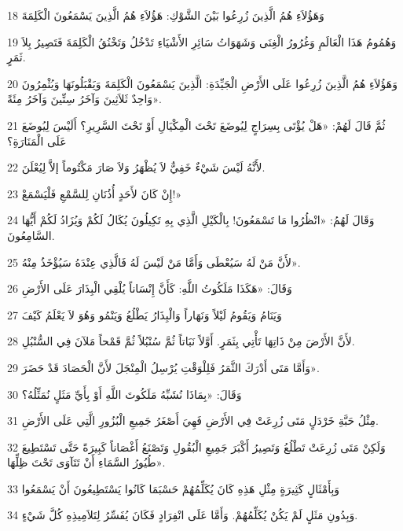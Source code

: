\par 18 وَهَؤُلاَءِ هُمُ الَّذِينَ زُرِعُوا بَيْنَ الشَّوْكِ: هَؤُلاَءِ هُمُ الَّذِينَ يَسْمَعُونَ الْكَلِمَةَ
\par 19 وَهُمُومُ هَذَا الْعَالَمِ وَغُرُورُ الْغِنَى وَشَهَوَاتُ سَائِرِ الأَشْيَاءِ تَدْخُلُ وَتَخْنُقُ الْكَلِمَةَ فَتَصِيرُ بِلاَ ثَمَرٍ.
\par 20 وَهَؤُلاَءِ هُمُ الَّذِينَ زُرِعُوا عَلَى الأَرْضِ الْجَيِّدَةِ: الَّذِينَ يَسْمَعُونَ الْكَلِمَةَ وَيَقْبَلُونَهَا وَيُثْمِرُونَ وَاحِدٌ ثَلاَثِينَ وَآخَرُ سِتِّينَ وَآخَرُ مِئَةً».
\par 21 ثُمَّ قَالَ لَهُمْ: «هَلْ يُؤْتَى بِسِرَاجٍ لِيُوضَعَ تَحْتَ الْمِكْيَالِ أَوْ تَحْتَ السَّرِيرِ؟ أَلَيْسَ لِيُوضَعَ عَلَى الْمَنَارَةِ؟
\par 22 لأَنَّهُ لَيْسَ شَيْءٌ خَفِيٌّ لاَ يُظْهَرُ وَلاَ صَارَ مَكْتُوماً إلاَّ لِيُعْلَنَ.
\par 23 إِنْ كَانَ لأَحَدٍ أُذُنَانِ لِلسَّمْعِ فَلْيَسْمَعْ!»
\par 24 وَقَالَ لَهُمُ: «انْظُرُوا مَا تَسْمَعُونَ! بِالْكَيْلِ الَّذِي بِهِ تَكِيلُونَ يُكَالُ لَكُمْ وَيُزَادُ لَكُمْ أَيُّهَا السَّامِعُونَ.
\par 25 لأَنَّ مَنْ لَهُ سَيُعْطَى وَأَمَّا مَنْ لَيْسَ لَهُ فَالَّذِي عِنْدَهُ سَيُؤْخَذُ مِنْهُ».
\par 26 وَقَالَ: «هَكَذَا مَلَكُوتُ اللَّهِ: كَأَنَّ إِنْسَاناً يُلْقِي الْبِذَارَ عَلَى الأَرْضِ
\par 27 وَيَنَامُ وَيَقُومُ لَيْلاً وَنَهَاراً وَالْبِذَارُ يَطْلُعُ وَيَنْمُو وَهُوَ لاَ يَعْلَمُ كَيْفَ
\par 28 لأَنَّ الأَرْضَ مِنْ ذَاتِهَا تَأْتِي بِثَمَرٍ. أَوَّلاً نَبَاتاً ثُمَّ سُنْبُلاً ثُمَّ قَمْحاً مَلآنَ فِي السُّنْبُلِ.
\par 29 وَأَمَّا مَتَى أَدْرَكَ الثَّمَرُ فَلِلْوَقْتِ يُرْسِلُ الْمِنْجَلَ لأَنَّ الْحَصَادَ قَدْ حَضَرَ».
\par 30 وَقَالَ: «بِمَاذَا نُشَبِّهُ مَلَكُوتَ اللَّهِ أَوْ بِأَيِّ مَثَلٍ نُمَثِّلُهُ؟
\par 31 مِثْلُ حَبَّةِ خَرْدَلٍ مَتَى زُرِعَتْ فِي الأَرْضِ فَهِيَ أَصْغَرُ جَمِيعِ الْبُزُورِ الَّتِي عَلَى الأَرْضِ.
\par 32 وَلَكِنْ مَتَى زُرِعَتْ تَطْلُعُ وَتَصِيرُ أَكْبَرَ جَمِيعِ الْبُقُولِ وَتَصْنَعُ أَغْصَاناً كَبِيرَةً حَتَّى تَسْتَطِيعَ طُيُورُ السَّمَاءِ أَنْ تَتَآوَى تَحْتَ ظِلِّهَا».
\par 33 وَبِأَمْثَالٍ كَثِيرَةٍ مِثْلِ هَذِهِ كَانَ يُكَلِّمُهُمْ حَسْبَمَا كَانُوا يَسْتَطِيعُونَ أَنْ يَسْمَعُوا
\par 34 وَبِدُونِ مَثَلٍ لَمْ يَكُنْ يُكَلِّمُهُمْ. وَأَمَّا عَلَى انْفِرَادٍ فَكَانَ يُفَسِّرُ لِتَلاَمِيذِهِ كُلَّ شَيْءٍ.
